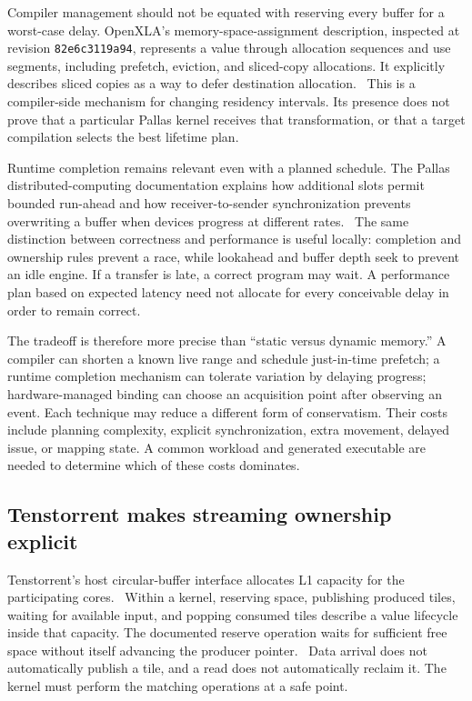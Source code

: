 Compiler management should not be equated with reserving every buffer for a worst-case delay. OpenXLA's memory-space-assignment description, inspected at revision \texttt{82e6c3119a94}, represents a value through allocation sequences and use segments, including prefetch, eviction, and sliced-copy allocations. It explicitly describes sliced copies as a way to defer destination allocation.~\citep{u002-xla-msa} This is a compiler-side mechanism for changing residency intervals. Its presence does not prove that a particular Pallas kernel receives that transformation, or that a target compilation selects the best lifetime plan.

Runtime completion remains relevant even with a planned schedule. The Pallas distributed-computing documentation explains how additional slots permit bounded run-ahead and how receiver-to-sender synchronization prevents overwriting a buffer when devices progress at different rates.~\citep{u002-pallas-distributed} The same distinction between correctness and performance is useful locally: completion and ownership rules prevent a race, while lookahead and buffer depth seek to prevent an idle engine. If a transfer is late, a correct program may wait. A performance plan based on expected latency need not allocate for every conceivable delay in order to remain correct.

The tradeoff is therefore more precise than ``static versus dynamic memory.'' A compiler can shorten a known live range and schedule just-in-time prefetch; a runtime completion mechanism can tolerate variation by delaying progress; hardware-managed binding can choose an acquisition point after observing an event. Each technique may reduce a different form of conservatism. Their costs include planning complexity, explicit synchronization, extra movement, delayed issue, or mapping state. A common workload and generated executable are needed to determine which of these costs dominates.

\subsection{Tenstorrent makes streaming ownership explicit}

Tenstorrent's host circular-buffer interface allocates L1 capacity for the participating cores.~\citep{u002-tt-cb} Within a kernel, reserving space, publishing produced tiles, waiting for available input, and popping consumed tiles describe a value lifecycle inside that capacity. The documented reserve operation waits for sufficient free space without itself advancing the producer pointer.~\citep{u002-tt-reserve} Data arrival does not automatically publish a tile, and a read does not automatically reclaim it. The kernel must perform the matching operations at a safe point.

